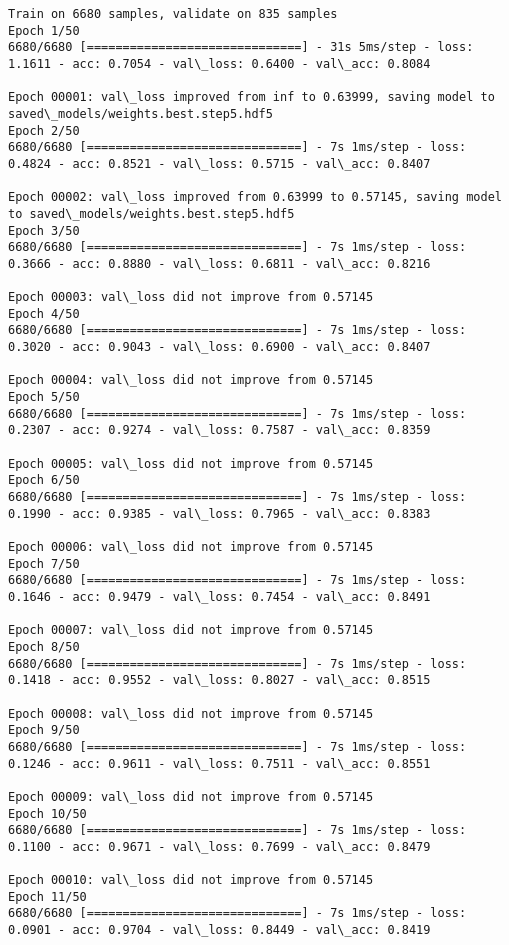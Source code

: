 \documentclass[11pt]{article}
\begin{document}
    \begin{Verbatim}[commandchars=\\\{\}]
Train on 6680 samples, validate on 835 samples
Epoch 1/50
6680/6680 [==============================] - 31s 5ms/step - loss: 1.1611 - acc: 0.7054 - val\_loss: 0.6400 - val\_acc: 0.8084

Epoch 00001: val\_loss improved from inf to 0.63999, saving model to saved\_models/weights.best.step5.hdf5
Epoch 2/50
6680/6680 [==============================] - 7s 1ms/step - loss: 0.4824 - acc: 0.8521 - val\_loss: 0.5715 - val\_acc: 0.8407

Epoch 00002: val\_loss improved from 0.63999 to 0.57145, saving model to saved\_models/weights.best.step5.hdf5
Epoch 3/50
6680/6680 [==============================] - 7s 1ms/step - loss: 0.3666 - acc: 0.8880 - val\_loss: 0.6811 - val\_acc: 0.8216

Epoch 00003: val\_loss did not improve from 0.57145
Epoch 4/50
6680/6680 [==============================] - 7s 1ms/step - loss: 0.3020 - acc: 0.9043 - val\_loss: 0.6900 - val\_acc: 0.8407

Epoch 00004: val\_loss did not improve from 0.57145
Epoch 5/50
6680/6680 [==============================] - 7s 1ms/step - loss: 0.2307 - acc: 0.9274 - val\_loss: 0.7587 - val\_acc: 0.8359

Epoch 00005: val\_loss did not improve from 0.57145
Epoch 6/50
6680/6680 [==============================] - 7s 1ms/step - loss: 0.1990 - acc: 0.9385 - val\_loss: 0.7965 - val\_acc: 0.8383

Epoch 00006: val\_loss did not improve from 0.57145
Epoch 7/50
6680/6680 [==============================] - 7s 1ms/step - loss: 0.1646 - acc: 0.9479 - val\_loss: 0.7454 - val\_acc: 0.8491

Epoch 00007: val\_loss did not improve from 0.57145
Epoch 8/50
6680/6680 [==============================] - 7s 1ms/step - loss: 0.1418 - acc: 0.9552 - val\_loss: 0.8027 - val\_acc: 0.8515

Epoch 00008: val\_loss did not improve from 0.57145
Epoch 9/50
6680/6680 [==============================] - 7s 1ms/step - loss: 0.1246 - acc: 0.9611 - val\_loss: 0.7511 - val\_acc: 0.8551

Epoch 00009: val\_loss did not improve from 0.57145
Epoch 10/50
6680/6680 [==============================] - 7s 1ms/step - loss: 0.1100 - acc: 0.9671 - val\_loss: 0.7699 - val\_acc: 0.8479

Epoch 00010: val\_loss did not improve from 0.57145
Epoch 11/50
6680/6680 [==============================] - 7s 1ms/step - loss: 0.0901 - acc: 0.9704 - val\_loss: 0.8449 - val\_acc: 0.8419


\end{Verbatim}
\end{document}
